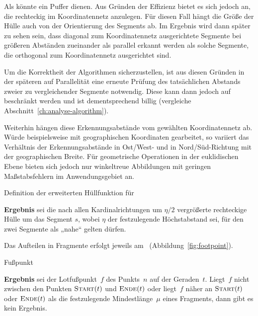 \documentclass[../main/thesis.tex]{subfiles}
\begin{document}
Als  könnte ein Puffer dienen.
Aus Gründen der Effizienz bietet es sich jedoch an, die  rechteckig im Koordinatennetz anzulegen.
Für diesen Fall hängt die Größe der Hülle auch von der Orientierung des Segments ab.
Im Ergebnis wird dann später zu sehen sein, dass diagonal zum Koordinatennetz ausgerichtete Segmente bei größeren Abständen zueinander als parallel erkannt werden als solche Segmente, die orthogonal zum Koordinatennetz ausgerichtet sind.

Um die Korrektheit der Algorithmen sicherzustellen, ist aus diesen Gründen in der späteren  auf Parallelität eine erneute Prüfung des tatsächlichen Abstands zweier zu vergleichender Segmente notwendig.
Diese kann dann jedoch auf  beschränkt werden und ist dementsprechend billig (vergleiche Abschnitt~\ref{ch:analyse-algorithm}).

Weiterhin hängen diese Erkennungsabstände vom gewählten Koordinatennetz ab.
Würde beispielsweise mit geographischen Koordinaten gearbeitet, so variiert das Verhältnis der Erkennungsabstände in Ost/West- und in Nord/Süd-Richtung mit der geographischen Breite.
Für geometrische Operationen in der euklidischen Ebene bieten sich jedoch nur winkeltreue Abbildungen mit geringen Maßstabsfehlern im Anwendungsgebiet an. 


\begin{algorithmhere}{Definition der erweiterten Hüllfunktion für }
\label{alg:Huelle}
\begin{algorithmic}
	\State \textbf{Ergebnis} sei die nach allen Kardinalrichtungen um $\eta/2$ vergrößerte rechteckige Hülle um das Segment $s$, wobei $\eta$ der festzulegende Höchstabstand sei, für den zwei Segmente als „nahe“ gelten dürfen.
\EndFunction
\end{algorithmic}
\end{algorithmhere}

\noindent
Das Aufteilen in Fragmente erfolgt jeweils am ~(Abbildung~\ref{fig:footpoint}).

\begin{algorithmhere}{Fußpunkt}
\label{alg:Fusspunkt}
\begin{algorithmic}
	\State \textbf{Ergebnis} sei der Lotfußpunkt~$f$ des Punkts~$n$ auf der Geraden~$t$. Liegt~$f$ nicht zwischen den Punkten $\textproc{Start}(t)$ und $\textproc{Ende}(t)$ oder liegt~$f$ näher an $\textproc{Start}(t)$ oder $\textproc{Ende}(t)$ als die festzulegende Mindestlänge~$\mu$ eines Fragments, dann gibt es kein Ergebnis.
\EndFunction
\end{algorithmic}
\end{algorithmhere}
\end{document}
